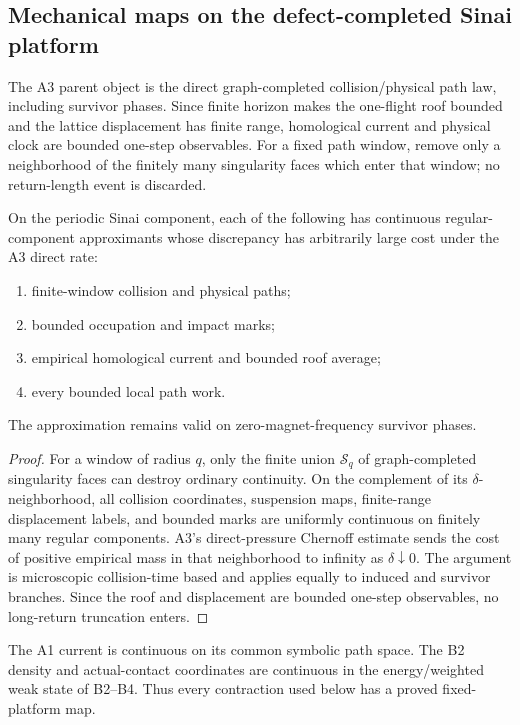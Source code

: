 \subsection{Mechanical maps on the defect-completed Sinai platform}

The A3 parent object is the direct graph-completed collision/physical path
law, including survivor phases.  Since finite horizon makes the one-flight
roof bounded and the lattice displacement has finite range, homological
current and physical clock are bounded one-step observables.  For a fixed path
window, remove only a neighborhood of the finitely many singularity faces
which enter that window; no return-length event is discarded.

\begin{lemma}
\label{lem:r3-c2-continuity}
On the periodic Sinai component, each of the following has continuous
regular-component approximants whose discrepancy has arbitrarily large cost
under the A3 direct rate:
\begin{enumerate}[label=(\roman*)]
\item finite-window collision and physical paths;
\item bounded occupation and impact marks;
\item empirical homological current and bounded roof average;
\item every bounded local path work.
\end{enumerate}
The approximation remains valid on zero-magnet-frequency survivor phases.
\end{lemma}

\begin{proof}
For a window of radius \(q\), only the finite union
\(\mathcal S_q\) of graph-completed singularity faces can destroy ordinary
continuity.  On the complement of its \(\delta\)-neighborhood, all collision
coordinates, suspension maps, finite-range displacement labels, and bounded
marks are uniformly continuous on finitely many regular components.  A3's
direct-pressure Chernoff estimate sends the cost of positive empirical mass in
that neighborhood to infinity as \(\delta\downarrow0\).  The argument is
microscopic collision-time based and applies equally to induced and survivor
branches.  Since the roof and displacement are bounded one-step observables,
no long-return truncation enters.
\end{proof}

The A1 current is continuous on its common symbolic path space.  The B2 density
and actual-contact coordinates are continuous in the energy/weighted weak
state of B2--B4.  Thus every contraction used below has a proved fixed-platform
map.

